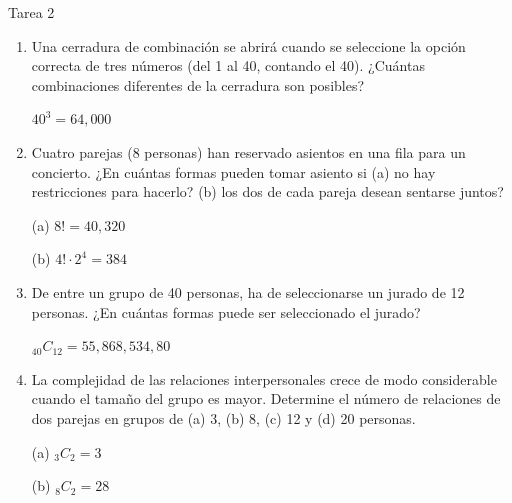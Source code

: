 \documentclass[a4paper, 12pt]{article}
\newcommand{\Pspace}{0.5cm}
\newcommand{\Aspace}{0.2cm}
\begin{document}
\newpage
\begin{center}
    { \LARGE Tarea 2}
\end{center}

\begin{enumerate}
    \item Una cerradura de combinación se abrirá cuando se seleccione la opción correcta de tres números (del 1 al 40, contando el 40). ¿Cuántas combinaciones diferentes de la cerradura son posibles?
    \vspace{\Aspace} \par
        { \color{azul} $40^{3} = 64,000$ }


    \vspace{\Pspace}
    \item Cuatro parejas (8 personas) han reservado asientos en una fila para un concierto. ¿En cuántas formas pueden tomar asiento si (a) no hay restricciones para hacerlo? (b) los dos de cada pareja desean sentarse juntos?
    \vspace{\Aspace} \par
    (a) { \color{azul} $8! = 40,320$ }

    \vspace{\Aspace}
    (b) { \color{azul} $4! \cdot 2^{4} = 384$ }
    

    \vspace{\Pspace}
    \item De entre un grupo de 40 personas, ha de seleccionarse un jurado de 12 personas. ¿En cuántas formas puede ser seleccionado el jurado?
    \vspace{\Aspace} \par
        { \color{azul} $_{40}C_{12} = 55,868,534,80$ }

    
    \vspace{\Pspace}
    \item La complejidad de las relaciones interpersonales crece de modo considerable cuando el tamaño del grupo es mayor. Determine el número de relaciones de dos parejas en grupos de (a) 3, (b) 8, (c) 12 y (d) 20 personas.
    \vspace{\Aspace} \par
    (a) { \color{azul} $_{3}C_{2} = 3$ }
    
    \vspace{\Aspace}
    (b) { \color{azul} $_{8}C_{2} = 28$ }
    

\end{enumerate}
\end{document}
